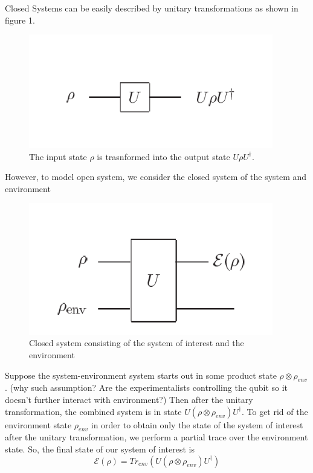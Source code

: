 \documentclass{article}
\begin{document}
Closed Systems can be easily described by unitary transformations as shown
in figure 1.
\begin{figure}[!htb]
	\centering
	\includegraphics[width=0.95\textwidth]{img/SystemPure1.png}
	\caption{The input state \(\rho\) is trasnformed into the output
  state \(U\rho U^{\dagger}\).}
	\label{}
\end{figure}
However, to model open system, we consider the closed system of
the system and environment
\begin{figure}[!htb]
	\centering
	\includegraphics[width=0.95\textwidth]{img/opensystem.png}
	\caption{Closed system consisting of the system of interest
  and the environment}
	\label{}
\end{figure}
Suppose the system-environment system starts out in some product state
\(\rho \otimes \rho_{env}\). (why such assumption? Are the experimentalists controlling the
qubit so it doesn't further interact with environment?) Then after the
unitary transformation, the combined system is in state
 \(U(\rho \otimes \rho_{env})U^{\dagger}\).
 To get rid of the environment state \(\rho_{env}\) in order to obtain
 only the state of the system of interest after the unitary transformation,
 we perform a partial trace over the environment state. So, the final state of our system of interest is
 \[\mathcal{E}(\rho) = Tr_{env}(U(\rho \otimes \rho_{env})U^{\dagger})\]
\end{document}
